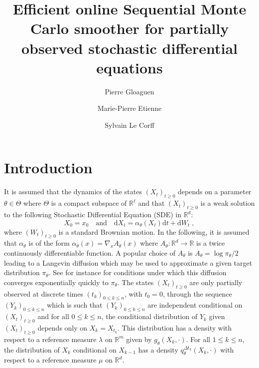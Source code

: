 \documentclass[12pt]{article}
\newcommand{\rmd}{\mathrm{d}}
\newcommand{\eqsp}{\;}
\newcommand{\1}{\mathrm{1}}
\begin{document}
\author{Pierre Gloaguen\footnotemark[1] \and Marie-Pierre Etienne\footnotemark[1] \and Sylvain Le {C}orff\footnotemark[2]}
 


\title{Efficient online Sequential Monte Carlo smoother for partially observed stochastic differential equations}


\maketitle


\section{Introduction}
It is assumed that the dynamics of the states $(X_t)_{t\ge 0}$ depends on a parameter $\theta\in \Theta$ where $\Theta$ is a compact subspace of $\mathbb{R}^{\ell}$ and that $(X_t)_{t\ge 0}$ is a weak solution to the following Stochastic Differential Equation (SDE) in $\mathbb{R}^d$:
\begin{equation}
\label{eq:target:sde}
X_0 = x_0\quad\mbox{and}\quad \rmd X_t = \alpha_{\theta}(X_t)\rmd t + \rmd W_t\eqsp,
\end{equation}
where $(W_t)_{t\ge 0}$ is a standard Brownian motion. In the following, it is assumed that $\alpha_{\theta}$ is of the form $\alpha_{\theta}(x) = \nabla_x A_{\theta}(x)$ where $A_{\theta}: \mathbb{R}^d \to \mathbb{R}$ is a twice continuously differentiable function. A popular choice of $A_{\theta}$  is $A_{\theta} = \log \pi_{\theta}/2$ leading to a Langevin diffusion which may be used to approximate a given target distribution $\pi_{\theta}$. See for instance \cite{roberts:tweedie:1996} for conditions under which this diffusion converges exponentially quickly to $\pi_{\theta}$. The states $(X_t)_{t\ge 0}$ are only partially observed at discrete times $(t_k)_{0\le k \le n}$, with $t_0=0$, through the sequence $(Y_k)_{0\le k\le n}$ which is such that $(Y_k)_{0\le k\le n}$ are independent conditional on $(X_t)_{t\ge 0}$ and for all $0\le k\le n$, the conditional distribution of $Y_k$ given $(X_t)_{t\ge 0}$ depends only on $X_k = X_{t_k}$. This distribution has a density with respect to a reference measure $\lambda$ on $\mathbb{R}^m$ given by $g_{\theta}(X_k,\cdot)$. For all $1\le k \le n$, the distribution of $X_{k} $ conditional on $X_{k-1}$ has a density $q^{\Delta t_k}_{\theta}(X_k,\cdot)$ with respect to a reference measure $\mu$ on $\mathbb{R}^d$.
\end{document}
